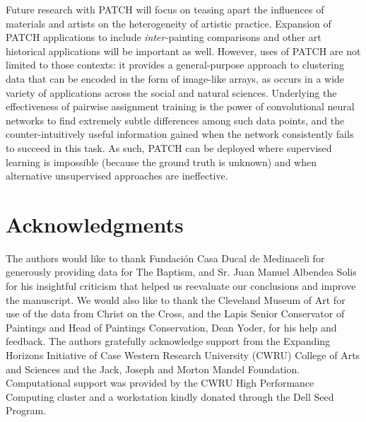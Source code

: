 \documentclass[11pt]{article}
\begin{document}
Future research with PATCH will focus on teasing apart the influences of
materials and artists on the heterogeneity of artistic practice.
Expansion of PATCH applications to include \emph{inter-}painting
comparisons and other art historical applications will be important as
well. However, uses of PATCH are not limited to those contexts: it
provides a general-purpose approach to clustering data that can be
encoded in the form of image-like arrays, as occurs in a wide variety of
applications across the social and natural sciences. Underlying the
effectiveness of pairwise assignment training is the power of
convolutional neural networks to find extremely subtle differences among
such data points, and the counter-intuitively useful information gained
when the network consistently fails to succeed in this task. As such,
PATCH can be deployed where supervised learning is impossible (because
the ground truth is unknown) and when alternative unsupervised
approaches are ineffective.

\section*{Acknowledgments}

The authors would like to thank Fundación Casa Ducal de Medinaceli
for generously providing data for The Baptism, and Sr. Juan Manuel
Albendea Solis for his insightful criticism that helped us reevaluate
our conclusions and improve the manuscript. We would also like to thank
the Cleveland Museum of Art for use of the data from Christ on the
Cross, and the Lapis Senior Conservator of Paintings and Head of
Paintings Conservation, Dean Yoder, for his help and feedback. The
authors gratefully acknowledge support from the Expanding Horizons
Initiative of Case Western Research University (CWRU) College of Arts
and Sciences and the Jack, Joseph and Morton Mandel Foundation.
Computational support was provided by the CWRU High Performance
Computing cluster and a workstation kindly donated through the Dell Seed
Program.




\end{document}

